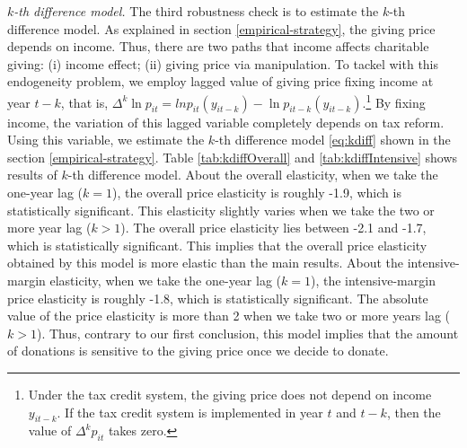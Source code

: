 \documentclass[
  11pt,
  a4paper,
]{article}
\begin{document}
\emph{\(k\)-th difference model.}
The third robustness check is to estimate the \(k\)-th difference model.
As explained in section \ref{empirical-strategy}, the giving price depends on income.
Thus, there are two paths that income affects charitable giving: (i) income effect; (ii) giving price via manipulation.
To tackel with this endogeneity problem, we employ lagged value of giving price fixing income at year \(t-k\),
that is, \(\Delta^k \ln p_{it} = ln p_{it}(y_{it-k}) - \ln p_{it-k}(y_{it-k})\).\footnote{Under the tax credit system, the giving price does not depend on income \(y_{it-k}\). If the tax credit system is implemented in year \(t\) and \(t-k\), then the value of \(\Delta^k p_{it}\) takes zero.}
By fixing income, the variation of this lagged variable completely depends on tax reform.
Using this variable,
we estimate the \(k\)-th difference model \eqref{eq:kdiff} shown in the section \ref{empirical-strategy}.
Table \ref{tab:kdiffOverall} and \ref{tab:kdiffIntensive} shows results of \(k\)-th difference model.
About the overall elasticity,
when we take the one-year lag (\(k = 1\)), the overall price elasticity is roughly -1.9,
which is statistically significant.
This elasticity slightly varies when we take the two or more year lag (\(k > 1\)).
The overall price elasticity lies between -2.1 and -1.7, which is statistically significant.
This implies that the overall price elasticity obtained by this model is more elastic than the main results.
About the intensive-margin elasticity,
when we take the one-year lag (\(k = 1\)), the intensive-margin price elasticity is roughly -1.8,
which is statistically significant.
The absolute value of the price elasticity is more than 2
when we take two or more years lag (\(k > 1\)).
Thus, contrary to our first conclusion,
this model implies that the amount of donations is sensitive to the giving price once we decide to donate.
\end{document}
